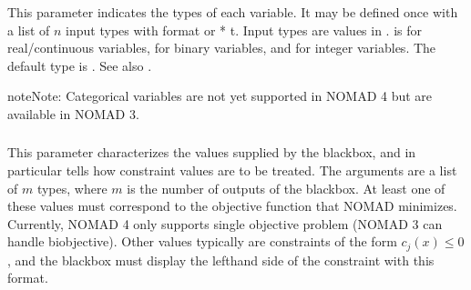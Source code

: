 \documentclass[letterpaper,10pt,english]{sphinxmanual}
\begin{document}
\subsubsection{}
\label{\detokenize{HowToUseNomad:bb-input-type}}\label{\detokenize{HowToUseNomad:id6}}
\sphinxAtStartPar
This parameter indicates the types of each variable.
It may be defined once with a list of \(n\) input types with format   or \textasciigrave{}\textasciigrave{} * t\textasciigrave{}\textasciigrave{}.
Input types  are values in .  is for real/continuous variables,  for binary variables, and  for integer variables.
The default type is . See also {\hyperref[\detokenize{ListOfParameters::doc}]{}}.

\begin{sphinxadmonition}{note}{Note:}
\sphinxAtStartPar
Categorical variables are not yet supported in NOMAD 4 but are available in NOMAD 3.
\end{sphinxadmonition}


\subsubsection{}
\label{\detokenize{HowToUseNomad:bb-output-type}}\label{\detokenize{HowToUseNomad:id7}}
\sphinxAtStartPar
This parameter characterizes the values supplied by the blackbox, and in particular tells how constraint values are to be treated. The arguments are a list of \(m\) types, where \(m\) is the number of outputs of the  blackbox. At least one of these values must correspond to the objective function that NOMAD minimizes. Currently, NOMAD 4 only supports single objective problem (NOMAD 3 can handle bi\sphinxhyphen{}objective). Other values typically are constraints of the form \(c_j(x) \leq 0\), and the blackbox  must display the left\sphinxhyphen{}hand side of the constraint with this format.
\end{document}
